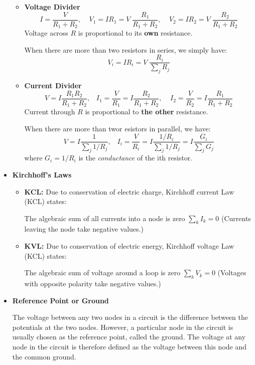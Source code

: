 \begin{itemize}
  
      \begin{itemize}
      \item {\bf Voltage Divider}
	\[ I=\frac{V}{R_1+R_2},\;\;\;\;V_1=IR_1=V\;\frac{R_1}{R_1+R_2},\;\;\;\;
	V_2=IR_2=V\;\frac{R_2}{R_1+R_2} \]
	Voltage across $R$ is proportional to its {\bf own} resistance.

	When there are more than two resistors in series, we simply have:
	\[ V_i=IR_i=V\;\frac{R_i}{\sum_j R_j} \]

      \item {\bf Current Divider}
	\[ V=I\frac{R_1R_2}{R_1+R_2},\;\;\;I_1=\frac{V}{R_1}=I\frac{R_2}{R_1+R_2},
	\;\;\;\;I_2=\frac{V}{R_2}=I\frac{R_1}{R_1+R_2}  \]
	Current through $R$ is proportional to {\bf the other} resistance.

	When there are more than twor esistors in parallel, we have:
	\[ V=I\frac{1}{\sum_j 1/R_j},\;\;\;I_i=\frac{V}{R_i}=I\frac{1/R_i}{\sum_j 1/R_j}
	=I\frac{G_i}{\sum_j G_j} \]
	where $G_i=1/R_i$ is the {\em conductance} of the ith resistor.

      \end{itemize}
      
    \item {\bf Kirchhoff's Laws}
      
      
      \begin{itemize} 
      \item {\bf KCL:} Due to conservation of electric charge, Kirchhoff 
	current Law (KCL) states:
	
	The algebraic sum of all currents into a node is zero $\sum_k I_k =0$
	(Currents leaving the node take negative values.)
      \item {\bf KVL:} Due to conservation of electric energy, Kirchhoff 
	voltage Law (KCL) states:

	The algebraic sum of voltage around a loop is zero $\sum_k V_k =0$
	(Voltages with opposite polarity take negative values.)

      \end{itemize}

    \item {\bf Reference Point or Ground}

      The voltage between any two nodes in a circuit is the difference between
      the potentials at the two nodes. However, a particular node in the
      circuit is usually chosen as the reference point, called the ground.
      The voltage at any node in the circuit is therefore defined as the 
      voltage between this node and the common ground.
      
\end{itemize}




	

	

